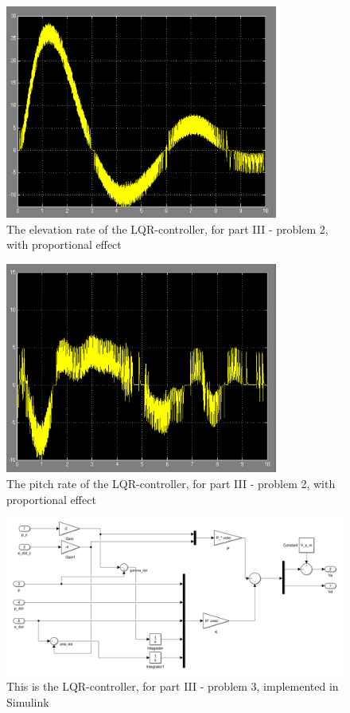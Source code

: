 \begin{figure}[H]
    \centering
    \includegraphics[width=0.8\textwidth]{figures/P3p2_elevationrate}
    \caption{The elevation rate of the LQR-controller, for part III - problem 2, with proportional effect}
    \label{fig:P3p3_elevationrate}
\end{figure}

\begin{figure}[H]
    \centering
    \includegraphics[width=0.8\textwidth]{figures/P3p2_pitchrate}
    \caption{The pitch rate of the LQR-controller, for part III - problem 2, with proportional effect}
    \label{fig:P3p2_pitchrate}
\end{figure}


\begin{figure}[H]
    \centering
    \includegraphics[width=1.2\textwidth]{figures/P3p3-LQR_PIreg}
    \caption{This is the LQR-controller, for part III - problem 3, implemented in Simulink}
    \label{fig:P3p3-LQR_PIreg}
\end{figure}

